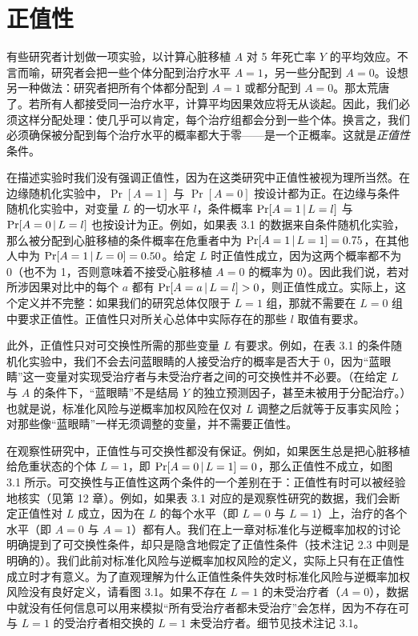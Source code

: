 \section{正值性}

有些研究者计划做一项实验，以计算心脏移植 $A$ 对 5 年死亡率 $Y$ 的平均效应。不言而喻，研究者会把一些个体分配到治疗水平 $A=1$，另一些分配到 $A=0$。设想另一种做法：研究者把所有个体都分配到 $A=1$ 或都分配到 $A=0$。那太荒唐了。若所有人都接受同一治疗水平，计算平均因果效应将无从谈起。因此，我们必须这样分配处理：使几乎可以肯定，每个治疗组都会分到一些个体。换言之，我们必须确保被分配到每个治疗水平的概率都大于零——是一个正概率。这就是\emph{正值性}条件。


在描述实验时我们没有强调正值性，因为在这类研究中正值性被视为理所当然。在边缘随机化实验中，$\Pr[A=1]$ 与 $\Pr[A=0]$ 按设计都为正。在边缘与条件随机化实验中，对变量 $L$ 的一切水平 $l$，条件概率 $\Pr[A=1\,|\, L=l]$ 与 $\Pr[A=0\,|\, L=l]$ 也按设计为正。例如，如果表 3.1 的数据来自条件随机化实验，那么被分配到心脏移植的条件概率在危重者中为 $\Pr[A=1\,|\, L=1]=0.75$，在其他人中为 $\Pr[A=1\,|\, L=0]=0.50$。给定 $L$ 时正值性成立，因为这两个概率都不为 0（也不为 1，否则意味着不接受心脏移植 $A=0$ 的概率为 0）。因此我们说，若对所涉因果对比中的每个 $a$ 都有 $\Pr[A=a\,|\, L=l]>0$，则正值性成立。实际上，这个定义并不完整：如果我们的研究总体仅限于 $L=1$ 组，那就不需要在 $L=0$ 组中要求正值性。正值性只对所关心总体中实际存在的那些 $l$ 取值有要求。


此外，正值性只对可交换性所需的那些变量 $L$ 有要求。例如，在表 3.1 的条件随机化实验中，我们不会去问蓝眼睛的人接受治疗的概率是否大于 0，因为“蓝眼睛”这一变量对实现受治疗者与未受治疗者之间的可交换性并不必要。（在给定 $L$ 与 $A$ 的条件下，“蓝眼睛”不是结局 $Y$ 的独立预测因子，甚至未被用于分配治疗。）也就是说，标准化风险与逆概率加权风险在仅对 $L$ 调整之后就等于反事实风险；对那些像“蓝眼睛”一样无须调整的变量，并不需要正值性。

在观察性研究中，正值性与可交换性都没有保证。例如，如果医生总是把心脏移植给危重状态的个体 $L=1$，即 $\Pr[A=0\,|\, L=1]=0$，那么正值性不成立，如图 3.1 所示。可交换性与正值性这两个条件的一个差别在于：正值性有时可以被经验地核实（见第 12 章）。例如，如果表 3.1 对应的是观察性研究的数据，我们会断定正值性对 $L$ 成立，因为在 $L$ 的每个水平（即 $L=0$ 与 $L=1$）上，治疗的各个水平（即 $A=0$ 与 $A=1$）都有人。我们在上一章对标准化与逆概率加权的讨论明确提到了可交换性条件，却只是隐含地假定了正值性条件（技术注记 2.3 中则是明确的）。我们此前对标准化风险与逆概率加权风险的定义，实际上只有在正值性成立时才有意义。为了直观理解为什么正值性条件失效时标准化风险与逆概率加权风险没有良好定义，请看图 3.1。如果不存在 $L=1$ 的未受治疗者（$A=0$），数据中就没有任何信息可以用来模拟“所有受治疗者都未受治疗”会怎样，因为不存在可与 $L=1$ 的受治疗者相交换的 $L=1$ 未受治疗者。细节见技术注记 3.1。


